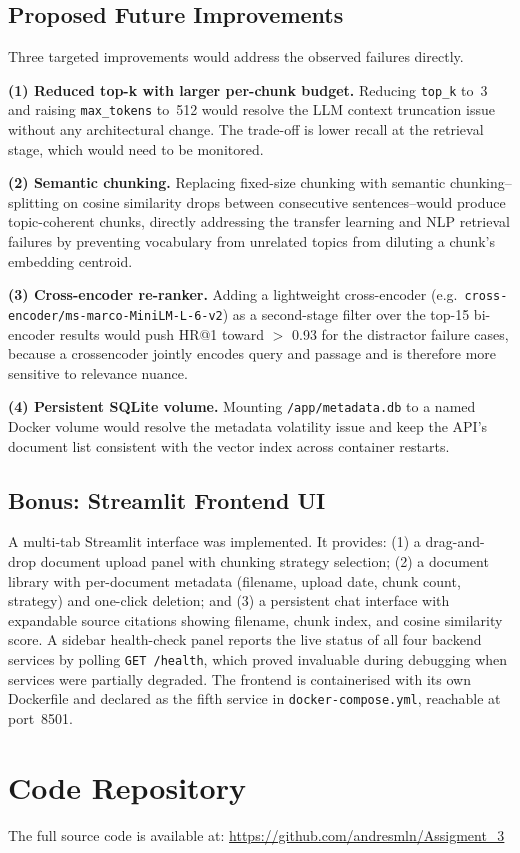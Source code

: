 \documentclass[10pt]{article}
\begin{document}
\subsection{Proposed Future Improvements}

Three targeted improvements would address the observed failures directly.

\textbf{(1) Reduced top-k with larger per-chunk budget.}
Reducing \texttt{top\_k} to~3 and raising \texttt{max\_tokens} to~512 would
resolve the LLM context truncation issue without any architectural change.
The trade-off is lower recall at the retrieval stage, which would need to be
monitored.

\textbf{(2) Semantic chunking.}
Replacing fixed-size chunking with semantic chunking--splitting on cosine
similarity drops between consecutive sentences--would produce topic-coherent
chunks, directly addressing the transfer learning and NLP retrieval failures
by preventing vocabulary from unrelated topics from diluting a chunk's
embedding centroid.

\textbf{(3) Cross-encoder re-ranker.}
Adding a lightweight cross-encoder
(e.g.\ \texttt{cross-encoder/ms-marco-MiniLM-L-6-v2}) as a second-stage
filter over the top-15 bi-encoder results would push HR@1 toward $>$ 0.93
for the distractor failure cases, because a crossencoder jointly encodes
query and passage and is therefore more sensitive to relevance nuance.

\textbf{(4) Persistent SQLite volume.}
Mounting \texttt{/app/metadata.db} to a named Docker volume would resolve the
metadata volatility issue and keep the API's document list consistent with the
vector index across container restarts.

\subsection{Bonus: Streamlit Frontend UI}

A multi-tab Streamlit interface was implemented.
It provides: (1) a drag-and-drop document upload panel with chunking strategy
selection; (2) a document library with per-document metadata (filename, upload
date, chunk count, strategy) and one-click deletion; and (3) a persistent chat
interface with expandable source citations showing filename, chunk index, and
cosine similarity score.
A sidebar health-check panel reports the live status of all four backend
services by polling \texttt{GET /health}, which proved invaluable during
debugging when services were partially degraded.
The frontend is containerised with its own Dockerfile and declared as the
fifth service in \texttt{docker-compose.yml}, reachable at port~8501.


\section*{Code Repository}
The full source code is available at:
\url{https://github.com/andresmln/Assigment_3}
\end{document}
